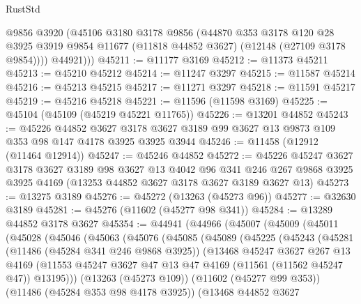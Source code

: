 \begin{lexlean}{RustStd}
\begin{coremodule}
          @9856
          @3920
          (@45106
            @3180
            @3178
            @9856
            (@44870
              @353
              @3178
              @120
              @28
              @3925
              @3919
              @9854
              @11677
              (@11818 @44852 @3627)
              (@12148 (@27109 @3178 @9854))))
          @44921)))
@45211 := @11177 @3169
@45212 := @11373 @45211
@45213 := @45210 @45212
@45214 := @11247 @3297
@45215 := @11587 @45214
@45216 := @45213 @45215
@45217 := @11271 @3297
@45218 := @11591 @45217
@45219 := @45216 @45218
@45221 := @11596 (@11598 @3169)
@45225 := @45104 (@45109 (@45219 @45221 @11765))
@45226 := @13201 @44852
@45243 := @45226
    @44852
    @3627
    @3178
    @3627
    @3189
    @99
    @3627
    @13
    @9873
    @109
    @353
    @98
    @147
    @4178
    @3925
    @3925
    @3944
@45246 := @11458 (@12912 (@11464 @12914))
@45247 := @45246 @44852
@45272 := @45226
    @45247
    @3627
    @3178
    @3627
    @3189
    @98
    @3627
    @13
    @4042
    @96
    @341
    @246
    @267
    @9868
    @3925
    @3925
    @4169
    (@13253 @44852 @3627 @3178 @3627 @3189 @3627 @13)
@45273 := @13275 @3189
@45276 := @45272 (@13263 (@45273 @96))
@45277 := @32630 @3189
@45281 := @45276 (@11602 (@45277 @98 @341))
@45284 := @13289 @44852 @3178 @3627
@45354 := @44941
    (@44966
      (@45007
        (@45009
          (@45011
            (@45028
              (@45046
                (@45063
                  (@45076
                    (@45085
                      (@45089
                        (@45225
                          (@45243
                            (@45281
                              (@11486 (@45284 @341 @246 @9868 @3925))
                              (@13468
                                @45247
                                @3627
                                @267
                                @13
                                @4169
                                (@11553
                                  @45247
                                  @3627
                                  @47
                                  @13
                                  @47
                                  @4169
                                  (@11561 (@11562 @45247 @47))
                                  @13195)))
                            (@13263 (@45273 @109))
                            (@11602 (@45277 @99 @353))
                            (@11486 (@45284 @353 @98 @4178 @3925))
                            (@13468
                              @44852
                              @3627

\end{coremodule}
\end{lexlean}

